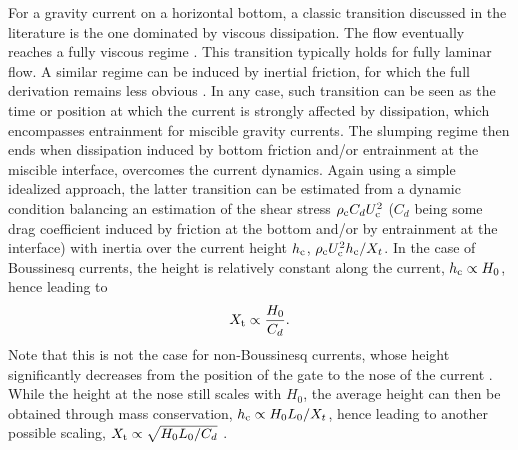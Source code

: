 \documentclass[12pt]{article}
\begin{document}
For a gravity current on a horizontal bottom, a classic transition discussed in the literature is the one dominated by viscous dissipation. The flow eventually reaches a fully viscous regime \citep{Huppert1980}. This transition typically holds for fully laminar flow. A similar regime can be induced by inertial friction, for which the full derivation remains less obvious \citep[see for instance][for the case of a constant-influx current]{Hogg2001}. In any case, such transition can be seen as the time or position at which the current is strongly affected by dissipation, which encompasses entrainment for miscible gravity currents. The slumping regime then ends when dissipation induced by bottom friction and/or entrainment at the miscible interface, overcomes the current dynamics.
%
Again using a simple idealized approach, the latter transition can be estimated from a dynamic condition balancing an estimation of the shear stress $\rho_{\text c} C_d U_{\text{c}}^2$ ($C_d$ being some drag coefficient induced by friction at the bottom and/or by entrainment at the interface) with inertia over the current height $h_{\text c}$, $\rho_{\text c} U_{\text{c}}^2 h_{\text c} /X_t$. In the case of Boussinesq currents, the height is relatively constant along the current, $h_{\text c} \propto H_{0}$, hence leading to 
\begin{equation}
	\label{eq:Xt_drag}
	\displaystyle X_{\text t} \propto {\frac{H_0}{C_d}}.
\end{equation}
Note that this is not the case for non-Boussinesq currents, whose height significantly decreases from the position of the gate to the nose of the current \citep{Ungarish2011}. While the height at the nose still scales with $H_{0}$, the average height can then be obtained through mass conservation, $h_{\text c} \propto H_0 L_0/X_t$, hence leading to another possible scaling, $X_{\text t} \propto \sqrt{H_0 L_0/C_d}$ \citep[similar to][but for inertial drag instead of viscous dissipation]{Bougouin2022}.
\end{document}
